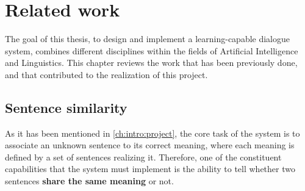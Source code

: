 
\chapter{Related work} %

\label{ch:rw} %


The goal of this thesis, to design and implement a learning-capable dialogue system, combines different disciplines within the fields of Artificial Intelligence and Linguistics. This chapter reviews the work that has been previously done, and that contributed to the realization of this project.


\section{Sentence similarity}
As it has been mentioned in \ref{ch:intro:project}, the core task of the system is to associate an unknown sentence to its correct meaning, where each meaning is defined by a set of sentences realizing it. Therefore, one of the constituent capabilities that the system must implement is the ability to tell whether two sentences \textbf{share the same meaning} or not.

